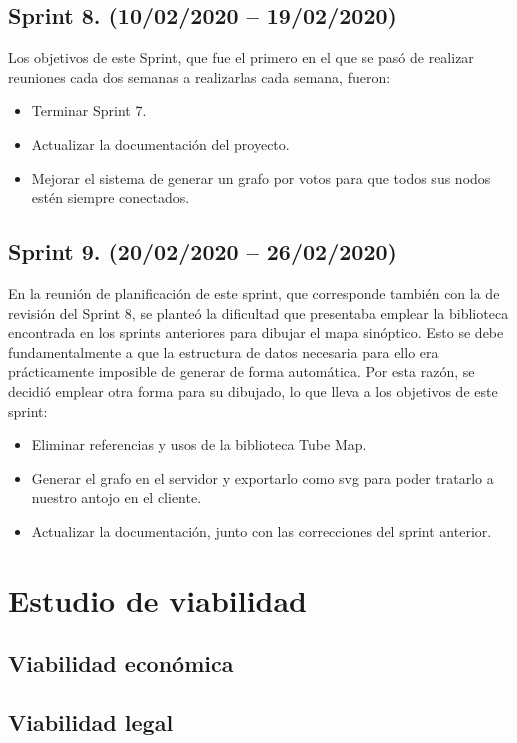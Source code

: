 \subsection{Sprint 8. (10/02/2020 -- 19/02/2020)}
Los objetivos de este Sprint, que fue el primero en el que se pasó de realizar reuniones cada dos semanas a realizarlas cada semana, fueron:
\begin{itemize}
	\item Terminar Sprint 7.
	\item Actualizar la documentación del proyecto.
	\item Mejorar el sistema de generar un grafo por votos para que todos sus nodos estén siempre conectados.
\end{itemize}

\subsection{Sprint 9. (20/02/2020 -- 26/02/2020)}
En la reunión de planificación de este sprint, que corresponde también con la de revisión del Sprint 8, se planteó la dificultad que presentaba emplear la biblioteca encontrada en los sprints anteriores para dibujar el mapa sinóptico. Esto se debe fundamentalmente a que la estructura de datos necesaria para ello era prácticamente imposible de generar de forma automática.
Por esta razón, se decidió emplear otra forma para su dibujado, lo que lleva a los objetivos de este sprint:
\begin{itemize}
	\item Eliminar referencias y usos de la biblioteca Tube Map.
	\item Generar el grafo en el servidor y exportarlo como svg para poder tratarlo a nuestro antojo en el cliente.
	\item Actualizar la documentación, junto con las correcciones del sprint anterior.
\end{itemize}

\section{Estudio de viabilidad}

\subsection{Viabilidad económica}

\subsection{Viabilidad legal}


